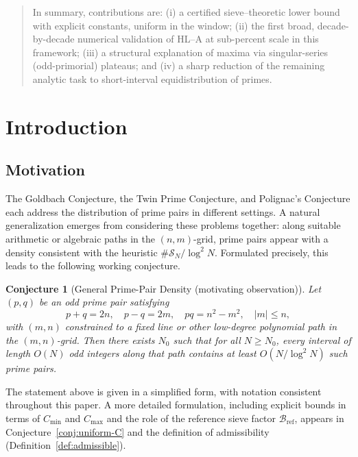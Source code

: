 \documentclass[11pt]{article}
\theoremstyle{inline}
\theoremstyle{break}
\theoremstyle{break}
\theoremstyle{break}
\theoremstyle{break}
\theoremstyle{break}
\newtheorem{conjecture}{Conjecture}
\theoremstyle{break}
\theoremstyle{break}
\theoremstyle{inline}
\newcommand{\tref}{{\scriptscriptstyle\mathrm{ref}}}
\newcommand{\Cmeas}{C}              %
\newcommand{\Bref}{\mathcal{B}_\tref}
\begin{document}
\begin{abstract}
In summary, contributions are: (i) a certified sieve–theoretic lower bound with explicit constants, uniform in the window; (ii) the first broad, decade-by-decade numerical validation of HL–A at sub-percent scale in this framework; (iii) a structural explanation of maxima via singular-series (odd-primorial) plateaus; and (iv) a sharp reduction of the remaining analytic task to short-interval equidistribution of primes.
\end{abstract}


\section{Introduction}

\subsection{Motivation}
The Goldbach Conjecture, the Twin Prime Conjecture, and Polignac’s Conjecture each address the distribution of prime pairs in different settings.  
A natural generalization emerges from considering these problems together: along suitable arithmetic or algebraic paths in the \( (n,m) \)-grid, prime pairs appear with a density consistent with the heuristic \( \#\mathcal{S}_N / \log^2 N \).  
Formulated precisely, this leads to the following working conjecture.

\begin{conjecture}[General Prime-Pair Density (motivating observation)]\label{conj:gppd}
Let \( (p,q) \) be an odd prime pair satisfying
\begin{equation}
p+q = 2n,\quad p-q = 2m,\quad pq = n^2 - m^2,\quad |m| \le n,
\end{equation}
with \( (m,n) \) constrained to a fixed line or other low-degree polynomial path in the \( (m,n) \)-grid.  
Then there exists \( N_0 \) such that for all \( N \ge N_0 \), every interval of length \( O(N) \) odd integers along that path contains at least \( O(N / \log^2 N) \) such prime pairs.
\end{conjecture}

The statement above is given in a simplified form, with notation consistent throughout this paper.  
A more detailed formulation, including explicit bounds in terms of \( \Cmeas_{\min} \) and \( \Cmeas_{\max} \) and the role of the reference sieve factor \( \Bref \), appears in Conjecture~\ref{conj:uniform-C} and the definition of admissibility (Definition~\ref{def:admissible}).
\end{document}
